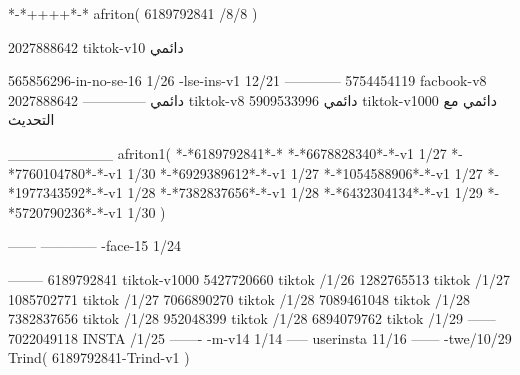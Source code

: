 *-*++++*-*
afriton(
6189792841 /8/8
)

2027888642 tiktok-v10
دائمي

565856296-in-no-se-16 1/26
-lse-ins-v1 12/21
------------
5754454119 facbook-v8
دائمي
--------------
2027888642 tiktok-v8
دائمي
5909533996 tiktok-v1000
دائمي مع التحديث

__________
afriton1(
*-*6189792841*-*
*-*6678828340*-*-v1 1/27
*-*7760104780*-*-v1 1/30
*-*6929389612*-*-v1 1/27
*-*1054588906*-*-v1 1/27
*-*1977343592*-*-v1 1/28
*-*7382837656*-*-v1 1/28
*-*6432304134*-*-v1 1/29
*-*5720790236*-*-v1 1/30
)

------
------------
-face-15 1/24

--------
6189792841 tiktok-v1000
5427720660 tiktok /1/26
1282765513 tiktok /1/27
1085702771 tiktok /1/27
7066890270 tiktok /1/28
7089461048 tiktok /1/28
7382837656 tiktok /1/28
952048399 tiktok /1/28
6894079762 tiktok /1/29
------
7022049118 INSTA /1/25
-------
-m-v14 1/14
-----
userinsta 11/16
------
-twe/10/29
Trind(
6189792841-Trind-v1 
)
